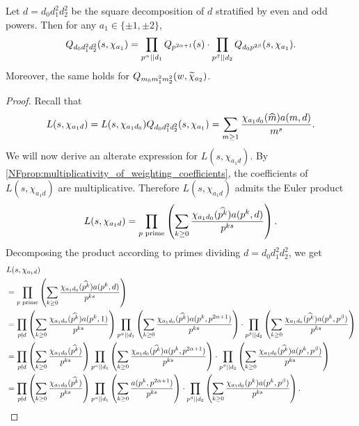    \begin{theorem}\label{NFthm:correction_polynomial_Euler_product}
        Let $d = d_{0}d_{1}^{2}d_{2}^{2}$ be the square decomposition of $d$ stratified by even and odd powers. Then for any $a_{1} \in \{\pm1,\pm2\}$,
        \[
            Q_{d_{0}d_{1}^{2}d_{2}^{2}}(s,\chi_{a_{1}}) = \prod_{p^{\alpha} \mid\mid d_{1}}Q_{p^{2\alpha+1}}(s) \cdot \prod_{p^{\beta} \mid\mid d_{2}}Q_{d_{0}p^{2\beta}}(s,\chi_{a_{1}}).
        \]
        Moreover, the same holds for $Q_{m_{0}m_{1}^{2}m_{2}^{2}}(w,\widetilde{\chi}
        _{a_{2}})$.
    \end{theorem}
    \begin{proof}
        Recall that
        \[
            L(s,\chi_{a_{1}d}) = L(s,\chi_{a_{1}d_{0}})Q_{d_{0}d_{1}^{2}d_{2}^{2}}(s,\chi_{a_{1}}) = \sum_{m \ge 1}\frac{\chi_{a_{1}d_{0}}(\widehat{m})a(m,d)}{m^{s}}.
        \]
        We will now derive an alterate expression for $L(s,\chi_{a_{1}d})$. By \cref{NFprop:multiplicativity_of_weighting_coefficients}, the coefficients of $L(s,\chi_{a_{1}d})$ are multiplicative. Therefore $L(s,\chi_{a_{1}d})$ admits the Euler product
        \[
            L(s,\chi_{a_{1}d}) = \prod_{\text{$p$ prime}}\left(\sum_{k \ge 0}\frac{\chi_{a_{1}d_{0}}(\widehat{p^{k}})a(p^{k},d)}{p^{ks}}\right).
        \]
        Decomposing the product according to primes dividing $d = d_{0}d_{1}^{2}d_{2}^{2}$, we get
        \begin{align*}
            & L(s,\chi_{a_{1}d}) \\
            &= \prod_{\text{$p$ prime}}\left(\sum_{k \ge 0}\frac{\chi_{a_{1}d_{0}}(\what{p^{k}})a(p^{k},d)}{p^{ks}}\right) \\
            &= \prod_{p \nmid d}\left(\sum_{k \ge 0}\frac{\chi_{a_{1}d_{0}}(\what{p^{k}})a(p^{k},1)}{p^{ks}}\right)\prod_{p^{\a} \mid\mid d_{1}}\left(\sum_{k \ge 0}\frac{\chi_{a_{1}d_{0}}(\what{p^{k}})a(p^{k},p^{2\a+1})}{p^{ks}}\right) \cdot \prod_{p^{\b} \mid\mid d_{2}}\left(\sum_{k \ge 0}\frac{\chi_{a_{1}d_{0}}(\what{p^{k}})a(p^{k},p^{\b})}{p^{ks}}\right) \\
            &= \prod_{p \nmid d}\left(\sum_{k \ge 0}\frac{\chi_{a_{1}d_{0}}(\what{p^{k}})}{p^{ks}}\right)\prod_{p^{\a} \mid\mid d_{1}}\left(\sum_{k \ge 0}\frac{\chi_{a_{1}d_{0}}(\what{p^{k}})a(p^{k},p^{2\a+1})}{p^{ks}}\right) \cdot \prod_{p^{\b} \mid\mid d_{2}}\left(\sum_{k \ge 0}\frac{\chi_{a_{1}d_{0}}(\what{p^{k}})a(p^{k},p^{\b})}{p^{ks}}\right) \\
            &= \prod_{p \nmid d}\left(\sum_{k \ge 0}\frac{\chi_{a_{1}d_{0}}(\what{p^{k}})}{p^{ks}}\right)\prod_{p^{\a} \mid\mid d_{1}}\left(\sum_{k \ge 0}\frac{a(p^{k},p^{2\a+1})}{p^{ks}}\right) \cdot \prod_{p^{\b} \mid\mid d_{2}}\left(\sum_{k \ge 0}\frac{\chi_{a_{1}d_{0}}(p^{k})a(p^{k},p^{\b})}{p^{ks}}\right).

\end{align*}
\end{proof}

